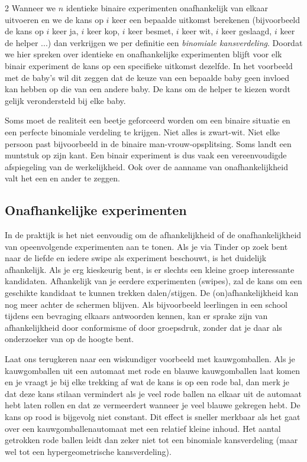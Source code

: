 \begin{multicols}{2}
    Wanneer we $n$ identieke binaire experimenten onafhankelijk van elkaar uitvoeren en we de kans op $i$ keer een bepaalde uitkomst berekenen (bijvoorbeeld de kans op $i$ keer ja, $i$ keer kop,  $i$ keer besmet, $i$ keer wit, $i$ keer geslaagd,  $i$ keer de helper ...) dan verkrijgen we per definitie een \emph{binomiale kansverdeling}. Doordat we hier spreken over identieke en onafhankelijke experimenten blijft voor elk binair experiment de kans op een specifieke uitkomst dezelfde. In het voorbeeld met de baby's wil dit zeggen dat de keuze van een bepaalde baby geen invloed kan hebben op die van een andere baby. De kans om de helper te kiezen wordt gelijk verondersteld bij elke baby.
    
    Soms moet de realiteit een beetje geforceerd worden om een binaire situatie en een perfecte binomiale verdeling te krijgen. Niet alles is zwart-wit. Niet elke persoon past bijvoorbeeld in de binaire man-vrouw-opsplitsing. Soms landt een muntstuk op zijn kant. Een binair experiment is dus vaak een vereenvoudigde afspiegeling van de werkelijkheid. Ook over de aanname van onafhankelijkheid valt het een en ander te zeggen.   
 

    \subsection*{Onafhankelijke experimenten}
	
    In de praktijk is het niet eenvoudig om de afhankelijkheid of de onafhankelijkheid van opeenvolgende experimenten aan te tonen. Als je via Tinder op zoek bent naar de liefde en iedere swipe als experiment beschouwt, is het duidelijk afhankelijk. Als je erg kieskeurig bent, is er slechts een kleine groep interessante kandidaten. Afhankelijk van je eerdere experimenten (swipes), zal de kans om een geschikte kandidaat te kunnen trekken dalen/stijgen. De (on)afhankelijkheid kan nog meer achter de schermen blijven. Als bijvoorbeeld leerlingen in een school tijdens een bevraging elkaars antwoorden kennen, kan er sprake zijn van afhankelijkheid door conformisme of door groepsdruk, zonder dat je daar als onderzoeker van op de hoogte bent.

    Laat ons terugkeren naar een wiskundiger voorbeeld met kauwgomballen.
    Als je kauwgomballen uit een automaat met rode en blauwe kauwgomballen laat komen en je vraagt je bij elke trekking af wat de kans is op een rode bal, dan merk je dat deze kans stilaan vermindert als je veel rode ballen na elkaar uit de automaat hebt laten rollen en dat ze vermeerdert wanneer je veel blauwe gekregen hebt. De kans op rood is bijgevolg niet constant. Dit effect is sneller merkbaar als het gaat over een kauwgomballenautomaat met een relatief kleine inhoud. Het aantal getrokken rode ballen leidt dan zeker niet tot een binomiale kansverdeling (maar wel tot een hypergeometrische kansverdeling). 
    

\end{multicols}
